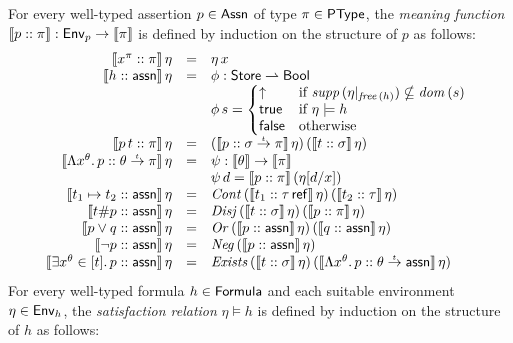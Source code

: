 \documentclass[12pt,a4paper]{report}
\newcommand{\Neg}{\nstyle{Neg}}
\newcommand{\Or}{\nstyle{Or}}
\newcommand{\Cont}{\nstyle{Cont}}
\newcommand{\Disj}{\nstyle{Disj}}
\newcommand{\Exists}{\nstyle{Exists}}
\begin{document}
\begin{definition}
  For every well-typed assertion $p \in \mathsf{Assn}$ of type $\pi \in \mathsf{PType}$, the
  {\em meaning function} $\llbracket{p}\mathrel{::}{\pi}\rrbracket: \mathsf{Env}_p \to \llbracket\pi\rrbracket$ is defined
  by induction on the structure of $p$ as follows:
  \[\begin{array}{rcl}
    \semantic{\tj{x^\pi}{\pi}}\,\eta 
      &=& \eta\,x \\
    \semantic{\tj{h}{\tassn}}\,\eta
      &=& \phi:\Store \pto \Bool \\
      & & \phi\,s = \bcase
                      \uparrow  & \text{if } \supp{\eta|_{\free{h}}} \nsubseteq \dom{s} \\
                      \true     & \text{if } \eta \models h \\
                      \false    & \text{otherwise}
                    \ecase \\
    \semantic{\tj{\app{p}{t}}{\pi}}\,\eta
      &=& (\semantic{\tj{p}{\ttarrow{\sigma}{\pi}}}\,\eta)\,
          (\semantic{\tj{t}{\sigma}}\,\eta) \\
    \semantic{\tj{\tabstr{x^\theta}{p}}{\ttarrow{\theta}{\pi}}}\,\eta
      &=& \psi: \semantic{\theta} \to \semantic{\pi} \\
      & & \psi\,d = \semantic{\tj{p}{\pi}}\,(\eta[d/x]) \\
    \semantic{\tj{t_1 \mapsto t_2}{\tassn}}\,\eta 
      &=& \Cont\,(\semantic{\tj{t_1}{\tref{\tau}}}\,\eta)\,(\semantic{\tj{t_2}{\tau}}\,\eta) \\
    \semantic{\tj{t \# p}{\tassn}}\,\eta
      &=& \Disj\,(\semantic{\tj{t}{\sigma}}\,\eta)\,(\semantic{\tj{p}{\pi}}\,\eta) \\
    \semantic{\tj{p \vee q}{\tassn}}\,\eta
      &=& \Or\,(\semantic{\tj{p}{\tassn}}\,\eta)\,(\semantic{\tj{q}{\tassn}}\,\eta) \\
    \semantic{\tj{\neg p}{\tassn}}\,\eta 
      &=& \Neg\,(\semantic{\tj{p}{\tassn}}\,\eta) \\
    \semantic{\tj{\qbex{x^\theta}{t}{p}}{\tassn}}\,\eta
    &=& \Exists\,(\semantic{\tj{t}{\sigma}}\,\eta)\,
                 (\semantic{\tj{\tabstr{x^\theta}{p}}{\ttarrow{\theta}{\tassn}}}\,\eta) \\
  \end{array}\]
  For every well-typed formula $h \in \mathsf{Formula}$ and each suitable environment $\eta \in \mathsf{Env}_h$,
  the {\em satisfaction relation} $\eta \models h$ is defined by induction on the structure of
  $h$ as follows:
  \[\begin{array}{rcl}

\end{array}\]
\end{definition}
\end{document}
